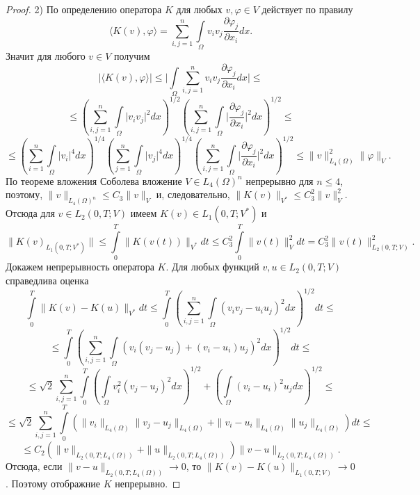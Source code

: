 \begin{proof}
        2) По определению оператора $K$ для любых $v,\varphi\in V$ действует по правилу
        $$\langle K(v),\varphi \rangle = \sum_{i,j=1}^{n}\int\limits_\Omega v_i v_j \frac{\partial \varphi_j}{\partial x_i}dx.$$
        Значит для любого $v\in V$ получим
        $$\bigg|\langle K(v),\varphi \rangle\bigg|\le\bigg|\int\limits_{\Omega}\sum_{i,j=1}^{n}v_i v_j \frac{\partial \varphi_j}{\partial x_i}dx\bigg|\le$$
        $$\le(\sum_{i,j=1}^{n}\int\limits_{\Omega}\bigg|v_i v_j\bigg|^2 dx)^{1/2}(\sum_{i,j=1}^{n}\int\limits_{\Omega}\bigg|\frac{\partial \varphi_j}{\partial x_i}\bigg|^2 dx)^{1/2}\le$$
        $$\le(\sum_{i=1}^{n}\int\limits_{\Omega}\bigg|v_i\bigg|^4 dx)^{1/4}(\sum_{j=1}^{n}\int\limits_{\Omega}\bigg|v_j\bigg|^4 dx)^{1/4}
        (\sum_{i,j=1}^{n}\int\limits_{\Omega}\bigg|\frac{\partial \varphi_j}{\partial x_i}\bigg|^2 dx)^{1/2}\le
        \|v\|^2_{L_4(\Omega)}\|\varphi\|_V.$$
        По теореме вложения Соболева вложение $V\in L_4(\Omega)^n$ непрерывно для $n\le 4$, поэтому, $\|v\|_{L_4(\Omega)^n}\le C_3\|v\|_V$ и, следовательно,
        $\|K(v)\|_{V^*}\le C_3^2\|v\|^2_V.$ Отсюда для $v\in L_2(0,T;V)$ имеем $K(v)\in L_1(0,T;V^*)$ и 
        $$\|K(v)_{L_1(0,T;V^*)}\|\le\int\limits_0^T\|K(v(t))\|_{V^*} dt\le C_3^2\int\limits_0^T\|v(t)\|_V^2 dt=C_3^2\|v(t)\|_{L_2(0,T;V)}^2.$$
        Докажем непрерывность оператора $K$. Для любых функций\linebreak
        $v,u\in L_2(0,T;V)$ справедлива оценка
        $$\int\limits_0^T\|K(v)-K(u)\|_{V^*} dt\le\int\limits_0^T(\sum_{i,j=1}^{n}\int\limits_\Omega (v_iv_j-u_iu_j)^2dx)^{1/2} dt\le$$
        $$\le\int\limits_0^T(\sum_{i,j=1}^{n}\int\limits_\Omega (v_i(v_j-u_j)+(v_i-u_i)u_j)^2dx)^{1/2}dt\le$$
        $$\le\sqrt2\sum_{i,j=1}^{n}\int\limits_0^T (\int\limits_{\Omega}v^2_i(v_j-u_j)^2dx)^{1/2}+
        (\int\limits_{\Omega}(v_i-u_i)^2u_j dx)^{1/2}\le$$
        $$\le\sqrt2\sum_{i,j=1}^{n}\int\limits_0^T(\|v_i\|_{L_4(\Omega)}\|v_j-u_j\|_{L_4(\Omega)}
        +\|v_i-u_i\|_{L_4(\Omega)}\|u_j\|_{L_4(\Omega)})dt\le$$
        $$\le C_2(\|v\|_{L_2(0,T;L_4(\Omega))}+\|u\|_{L_2(0,T;L_4(\Omega))})\|v-u\|_{L_2(0,T;L_4(\Omega))}.$$
        Отсюда, если $\|v-u\|_{L_2(0,T;L_4(\Omega))}\rightarrow 0$, то $\|K(v)-K(u)\|_{L_1(0,T;V)}\rightarrow 0$. Поэтому отображние $K$ непрерывно.
        
\end{proof}

